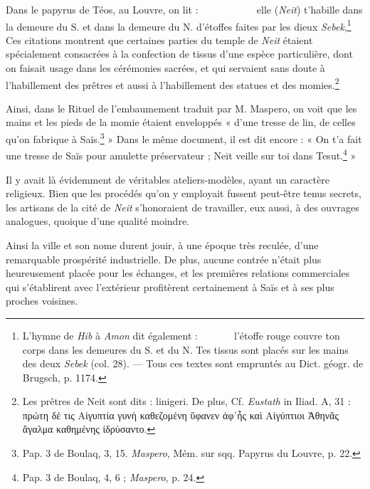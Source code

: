 \documentclass[letterpaper,twocolumn,openany,nodeprecatedcode]{dndbook}
\newcommand*\hieroAAAC{}
\newcommand*\hieroAAAG{}
\newcommand*\hieroAAAQ{}
\newcommand*\hieroAAAW{\raisebox{0.5ex}{}}
\newcommand*\hieroAAAX{}
\newcommand*\hieroAABR{}
\newcommand*\hieroAACM{}
\newcommand*\hieroAACN{\raisebox{1ex}{}}
\newcommand*\hieroAACS{}
\newcommand*\hieroAAEF{}
\newcommand*\hieroAAEK{}
\newcommand*\hieroAAEZ{}
\newcommand*\hieroAAFD{}
\newcommand*\hieroAAFZ{\raisebox{0.5ex}{}}
\newcommand*\hieroAAGC{}
\newcommand*\hieroAAGD{}
\newcommand*\hieroAAGE{}
\newcommand*\hieroAAGF{}
\newcommand*\hieroAAGG{}
\newcommand*\hieroAAGH{}
\newcommand*\hieroAAGI{}
\newcommand*\hieroAAGJ{}
\newcommand*\hieroAAGK{}
\newcommand*\hieroAAGL{}
\newcommand*\hieroAAGM{}
\newcommand*\hieroAAGN{}
\newcommand*\hieroAAGO{}
\newcommand*\hieroAAGP{\raisebox{0.3ex}{}}
\newcommand*\hieroAAGQ{}
\newcommand*\hieroAAGR{}
\newcommand*\hieroAAGS{}
\newcommand*\hieroAAGT{}
\begin{document}
Dans le papyrus de Téos, au Louvre, on lit : $\hieroAACS\:\hieroAAGC\:\hieroAAAG\allowbreak\:\hieroAABR\:\hieroAAFZ\:\hieroAACS\allowbreak\:\hieroAAGD\:\hieroAABR\:\hieroAAAX\allowbreak\:\hieroAAAQ\:\hieroAAAC\:\hieroAAGE\allowbreak\:\hieroAAAW\:\hieroAAGF\:\hieroAAGG\allowbreak\:\hieroAABR\:\hieroAAGH\:\hieroAACN\:\hieroAACS\allowbreak\:\hieroAAFD\:\hieroAAGI\:\hieroAAEK\allowbreak\:\hieroAAEK\:\hieroAAEF$ elle (\emph{Neit}) t'habille dans la demeure du S. et dans la demeure du N. d'étoffes faites par les dieux \emph{Sebek},\footnote{L'hymne de \emph{Hib} à \emph{Amon} dit également : $\hieroAAGJ\:\hieroAAGK\:\hieroAACM\allowbreak\:\hieroAAEZ\:\hieroAAGL\:\hieroAAGM\allowbreak\:\hieroAAAX\:\hieroAAGN\:\hieroAAGO\:\hieroAAGP\allowbreak\:\hieroAAGQ\:\hieroAAGR\allowbreak\:\hieroAAGS\:\hieroAAGT$ l'étoffe rouge couvre ton corps dans les demeures du S. et du N. Tes tissus sont placés sur les mains des deux \emph{Sebek} (col. 28). --- Tous ces textes sont empruntés au Dict. géogr. de Brugsch, p. 1174.} Ces citations montrent que certaines parties du temple de \emph{Neit} étaient spécialement consacrées à la confection de tissus d'une espèce particulière, dont on faisait usage dans les cérémonies sacrées, et qui servaient sans doute à l'habillement des prêtres et aussi à l'habillement des statues et des momies.\footnote{Les prêtres de Neit sont dits : linigeri. De plus, Cf. \emph{Eustath} in Iliad. A, 31 : πρώτη δέ τις Αἰγυπτία γυνὴ καθεζομένη ὕφανεν ἀφ᾽ἧς καὶ Αἰγύπτιοι Ἀθηνᾶς ἄγαλμα καθημένης ἱδρύσαντο.}

Ainsi, dans le Rituel de l'embaumement traduit par M. Maspero, on voit que les mains et les pieds de la momie étaient enveloppés « d'une tresse de lin, de celles qu'on fabrique à Saïs.\footnote{Pap. 3 de Boulaq, 3, 15. \emph{Maspero}, Mém. sur sqq. Papyrus du Louvre, p. 22.} » Dans le même document, il est dit encore : « On t'a fait une tresse de Saïs pour amulette préservateur ; Neit veille sur toi dans Tesut.\footnote{Pap. 3 de Boulaq, 4, 6 ; \emph{Maspero}, p. 24.} »

Il y avait là évidemment de véritables ateliers-modèles, ayant un caractère religieux. Bien que les procédés qu'on y employait fussent peut-être tenus secrets, les artisans de la cité de \emph{Neit} s'honoraient de travailler, eux aussi, à des ouvrages analogues, quoique d'une qualité moindre.

Ainsi la ville et son nome durent jouir, à une époque très reculée, d'une remarquable prospérité industrielle. De plus, aucune contrée n'était plus heureusement placée pour les échanges, et les premières relations commerciales qui s'établirent avec l'extérieur profitèrent certainement à Saïs et à ses plus proches voisines.
\end{document}
